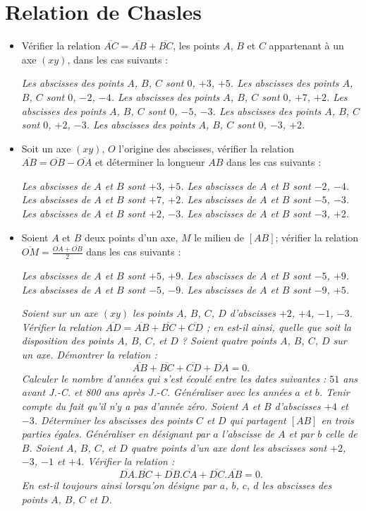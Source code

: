 \chapter{Relation de Chasles}

\begin{itemize}
\item Vérifier la relation $\overline{AC} = 
\overline{AB}+\overline{BC}$, les points $A$, $B$ et $C$ appartenant à un axe $(xy)$, dans les cas suivants : 
\begin{itemize}
\it Les abscisses des points $A$, $B$, $C$ sont $0$,
$+3$, $+5$.
\it Les abscisses des points $A$, $B$, $C$ sont $0$,
$-2$, $-4$.
\it Les abscisses des points $A$, $B$, $C$ sont $0$,
$+7$, $+2$.
\it Les abscisses des points $A$, $B$, $C$ sont $0$,
$-5$, $-3$.
\it Les abscisses des points $A$, $B$, $C$ sont $0$,
$+2$, $-3$.
\it Les abscisses des points $A$, $B$, $C$ sont $0$,
$-3$, $+2$.
\end{itemize}
\item Soit un axe $(xy)$, $O$ l'origine des abscisses, vérifier la relation $\overline{AB} = 
\overline{OB}-\overline{OA}$ et déterminer la longueur $AB$ dans les cas suivants : \begin{itemize}
\it Les abscisses de $A$ et $B$ sont $+3$, $+5$.
\it Les abscisses de $A$ et $B$ sont $-2$, $-4$.
\it Les abscisses de $A$ et $B$ sont $+7$, $+2$.
\it Les abscisses de $A$ et $B$ sont $-5$, $-3$.
\it Les abscisses de $A$ et $B$ sont $+2$, $-3$.
\it Les abscisses de $A$ et $B$ sont $-3$, $+2$.
\end{itemize}
\item Soient $A$ et $B$ deux points d'un axe, $M$ le milieu de $[AB]$; vérifier la relation $\displaystyle\overline{OM} = \frac{\overline{OA}+\overline{OB}}2$
dans les cas suivants : \begin{itemize}
\it Les abscisses de $A$ et $B$ sont $+5$, $+9$.
\it Les abscisses de $A$ et $B$ sont $-5$, $+9$.
\it Les abscisses de $A$ et $B$ sont $-5$, $-9$.
\it Les abscisses de $A$ et $B$ sont $-9$, $+5$.
\end{itemize}
\it Soient sur un axe $(xy)$ les points $A$, $B$, $C$, $D$ d'abscisses $+2$, $+4$, $-1$, $-3$. Vérifier la relation $\overline{AD} = \overline{AB} + \overline{BC}
+\overline{CD}$ ; en est-il ainsi, quelle que soit la disposition des points $A$, $B$, $C$, et $D$ ?
\it Soient quatre points $A$, $B$, $C$, $D$ sur un axe. Démontrer la relation : $$\overline{AB} + \overline{BC} + \overline{CD}
+\overline{DA}=0.$$
\it Calculer le nombre d'années qui s'est écoulé entre les dates suivantes : $51$ ans avant J.-C. et 800 ans après J.-C. Généraliser avec les années $a$ et $b$. Tenir compte du fait qu'il n'y a pas d'année zéro.
\it Soient $A$ et $B$ d'abscisses $+4$ et $-3$. Déterminer les abscisses des points $C$ et $D$ qui partagent $[AB]$ en trois parties égales. Généraliser en désignant par $a$ l'abscisse de $A$ et par $b$ celle de $B$. 
\it Soient $A$, $B$, $C$, et $D$ quatre points d'un axe dont les abscisses sont $+2$, $-3$, $-1$ et $+4$. Vérifier la relation : \[ \overline{DA}.\overline{BC}+\overline{DB}.\overline{CA}+\overline{DC}.\overline{AB}=0.\]
En est-il toujours ainsi lorsqu'on désigne par $a$, $b$, $c$, $d$ les abscisses des points $A$, $B$, $C$ et $D$.
\end{itemize}